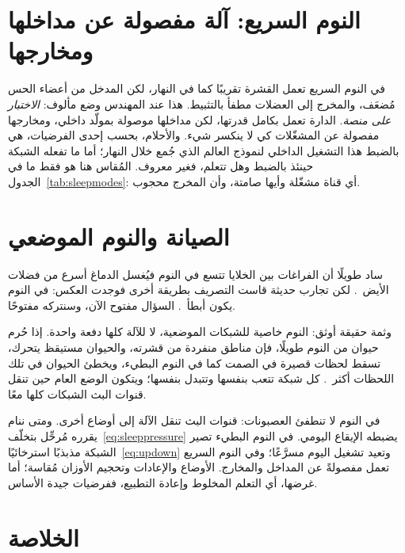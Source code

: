 \section{النوم السريع: آلة مفصولة عن مداخلها ومخارجها}

في النوم السريع تعمل القشرة تقريبًا كما في النهار، لكن المدخل من أعضاء الحس مُضعَف، والمخرج إلى العضلات مطفأ بالتثبيط. هذا عند المهندس وضع مألوف: \emph{الاختبار على منصة}. الدارة تعمل بكامل قدرتها، لكن مداخلها موصولة بمولّد داخلي، ومخارجها مفصولة عن المشغّلات كي لا ينكسر شيء. والأحلام، بحسب إحدى الفرضيات، هي بالضبط هذا التشغيل الداخلي لنموذج العالم الذي جُمع خلال النهار؛ أما ما تفعله الشبكة حينئذ بالضبط وهل تتعلم، فغير معروف. المُقاس هنا هو فقط ما في الجدول~\ref{tab:sleepmodes}: أي قناة مشغّلة وأيها صامتة، وأن المخرج محجوب.

\section{الصيانة والنوم الموضعي}

ساد طويلًا أن الفراغات بين الخلايا تتسع في النوم فيُغسل الدماغ أسرع من فضلات الأيض~\cite{Xie2013}. لكن تجارب حديثة قاست التصريف بطريقة أخرى فوجدت العكس: في النوم يكون أبطأ~\cite{Miao2024}. السؤال مفتوح الآن، وسنتركه مفتوحًا.

وثمة حقيقة أوثق: النوم خاصية للشبكات الموضعية، لا للآلة كلها دفعة واحدة. إذا حُرم حيوان من النوم طويلًا، فإن مناطق منفردة من قشرته، والحيوان مستيقظ يتحرك، تسقط لحظات قصيرة في الصمت كما في النوم البطيء، ويخطئ الحيوان في تلك اللحظات أكثر~\cite{Vyazovskiy2011}. كل شبكة تتعب بنفسها وتتبدل بنفسها؛ ويتكون الوضع العام حين تنقل قنوات البث الشبكات كلها معًا.

\begin{keyblock}
\begin{proposition}
\label{prop:sleep}
في النوم لا تنطفئ العصبونات: قنوات البث تنقل الآلة إلى أوضاع أخرى. ومتى ننام يقرره مُرحِّل بتخلّف~\eqref{eq:sleeppressure} يضبطه الإيقاع اليومي. في النوم البطيء تصير الشبكة مذبذبًا استرخائيًا~\eqref{eq:updown} وتعيد تشغيل اليوم مسرَّعًا؛ وفي النوم السريع تعمل مفصولةً عن المداخل والمخارج. الأوضاع والإعادات وتحجيم الأوزان مُقاسة؛ أما غرضها، أي التعلم المخلوط وإعادة التطبيع، ففرضيات جيدة الأساس.
\end{proposition}
\end{keyblock}

\section{الخلاصة}

